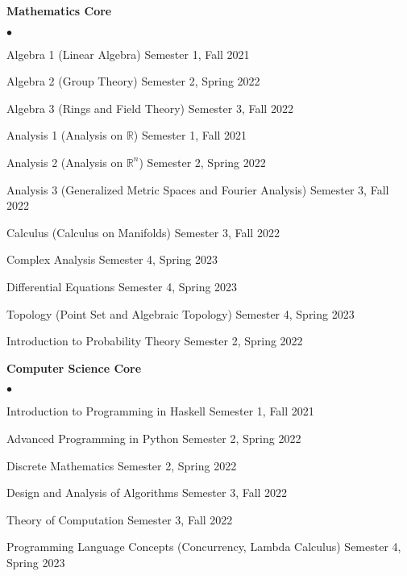 \documentclass[margin,line, 10pt]{res}
\newenvironment{list2}{
  \begin{list}{$\bullet$}{%
      \setlength{\itemsep}{0in}
      \setlength{\parsep}{0in} \setlength{\parskip}{0in}
      \setlength{\topsep}{0in} \setlength{\partopsep}{0in} 
      \setlength{\leftmargin}{0.2in}}}{\end{list}}
\begin{document}
\begin{resume}
{\bf Mathematics Core}
\begin{list2}
    \item Algebra 1 (Linear Algebra) \hfill Semester 1, Fall 2021 
    \item Algebra 2 (Group Theory) \hfill Semester 2, Spring 2022
    \item Algebra 3 (Rings and Field Theory) \hfill Semester 3, Fall 2022
    \item Analysis 1 (Analysis on $\mathbb{R}$) \hfill Semester 1, Fall 2021
    \item Analysis 2 (Analysis on $\mathbb{R}^n$) \hfill Semester 2, Spring 2022
    \item Analysis 3 (Generalized Metric Spaces and Fourier Analysis) \hfill Semester 3, Fall 2022
    \item Calculus (Calculus on Manifolds) \hfill Semester 3, Fall 2022
    \item Complex Analysis \hfill Semester 4, Spring 2023
    \item Differential Equations \hfill Semester 4, Spring 2023
    \item Topology (Point Set and Algebraic Topology) \hfill Semester 4, Spring 2023
    \item Introduction to Probability Theory \hfill Semester 2, Spring 2022
\end{list2}

{\bf Computer Science Core}
\begin{list2}
    \item Introduction to Programming in Haskell \hfill Semester 1, Fall 2021
    \item Advanced Programming in Python \hfill Semester 2, Spring 2022
    \item Discrete Mathematics \hfill Semester 2, Spring 2022
    \item Design and Analysis of Algorithms \hfill Semester 3, Fall 2022
    \item Theory of Computation \hfill Semester 3, Fall 2022
    \item Programming Language Concepts (Concurrency, Lambda Calculus) \hfill Semester 4, Spring 2023
\end{list2}


\end{resume}
\end{document}
